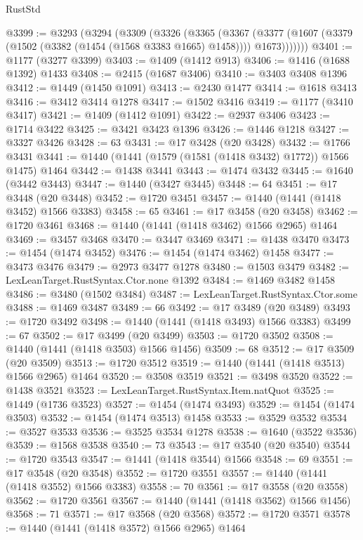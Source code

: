 \begin{lexlean}{RustStd}
\begin{coremodule}
@3399 := @3293
    (@3294
      (@3309
        (@3326
          (@3365
            (@3367
              (@3377 (@1607 (@3379 (@1502 (@3382 (@1454 (@1568 @3383 @1665) @1458)))) @1673)))))))
@3401 := @1177 (@3277 @3399)
@3403 := @1409 (@1412 @913)
@3406 := @1416 (@1688 @1392) @1433
@3408 := @2415 (@1687 @3406)
@3410 := @3403 @3408 @1396
@3412 := @1449 (@1450 @1091)
@3413 := @2430 @1477
@3414 := @1618 @3413
@3416 := @3412 @3414 @1278
@3417 := @1502 @3416
@3419 := @1177 (@3410 @3417)
@3421 := @1409 (@1412 @1091)
@3422 := @2937 @3406
@3423 := @1714 @3422
@3425 := @3421 @3423 @1396
@3426 := @1446 @1218
@3427 := @3327 @3426
@3428 := 63
@3431 := @17 @3428 (@20 @3428)
@3432 := @1766 @3431
@3441 := @1440 (@1441 (@1579 (@1581 (@1418 @3432) @1772)) @1566 @1475) @1464
@3442 := @1438 @3441
@3443 := @1474 @3432
@3445 := @1640 (@3442 @3443)
@3447 := @1440 (@3427 @3445)
@3448 := 64
@3451 := @17 @3448 (@20 @3448)
@3452 := @1720 @3451
@3457 := @1440 (@1441 (@1418 @3452) @1566 @3383)
@3458 := 65
@3461 := @17 @3458 (@20 @3458)
@3462 := @1720 @3461
@3468 := @1440 (@1441 (@1418 @3462) @1566 @2965) @1464
@3469 := @3457 @3468
@3470 := @3447 @3469
@3471 := @1438 @3470
@3473 := @1454 (@1474 @3452)
@3476 := @1454 (@1474 @3462) @1458
@3477 := @3473 @3476
@3479 := @2973 @3477 @1278
@3480 := @1503 @3479
@3482 := LexLeanTarget.RustSyntax.Ctor.none @1392
@3484 := @1469 @3482 @1458
@3486 := @3480 (@1502 @3484)
@3487 := LexLeanTarget.RustSyntax.Ctor.some
@3488 := @1469 @3487
@3489 := 66
@3492 := @17 @3489 (@20 @3489)
@3493 := @1720 @3492
@3498 := @1440 (@1441 (@1418 @3493) @1566 @3383)
@3499 := 67
@3502 := @17 @3499 (@20 @3499)
@3503 := @1720 @3502
@3508 := @1440 (@1441 (@1418 @3503) @1566 @1456)
@3509 := 68
@3512 := @17 @3509 (@20 @3509)
@3513 := @1720 @3512
@3519 := @1440 (@1441 (@1418 @3513) @1566 @2965) @1464
@3520 := @3508 @3519
@3521 := @3498 @3520
@3522 := @1438 @3521
@3523 := LexLeanTarget.RustSyntax.Item.natQuot
@3525 := @1449 (@1736 @3523)
@3527 := @1454 (@1474 @3493)
@3529 := @1454 (@1474 @3503)
@3532 := @1454 (@1474 @3513) @1458
@3533 := @3529 @3532
@3534 := @3527 @3533
@3536 := @3525 @3534 @1278
@3538 := @1640 (@3522 @3536)
@3539 := @1568 @3538
@3540 := 73
@3543 := @17 @3540 (@20 @3540)
@3544 := @1720 @3543
@3547 := @1441 (@1418 @3544) @1566
@3548 := 69
@3551 := @17 @3548 (@20 @3548)
@3552 := @1720 @3551
@3557 := @1440 (@1441 (@1418 @3552) @1566 @3383)
@3558 := 70
@3561 := @17 @3558 (@20 @3558)
@3562 := @1720 @3561
@3567 := @1440 (@1441 (@1418 @3562) @1566 @1456)
@3568 := 71
@3571 := @17 @3568 (@20 @3568)
@3572 := @1720 @3571
@3578 := @1440 (@1441 (@1418 @3572) @1566 @2965) @1464

\end{coremodule}
\end{lexlean}
